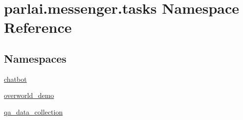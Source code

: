 \hypertarget{namespaceparlai_1_1messenger_1_1tasks}{}\section{parlai.\+messenger.\+tasks Namespace Reference}
\label{namespaceparlai_1_1messenger_1_1tasks}
\subsection*{Namespaces}
\begin{DoxyCompactItemize}
\item 
 \hyperlink{namespaceparlai_1_1messenger_1_1tasks_1_1chatbot}{chatbot}
\item 
 \hyperlink{namespaceparlai_1_1messenger_1_1tasks_1_1overworld__demo}{overworld\+\_\+demo}
\item 
 \hyperlink{namespaceparlai_1_1messenger_1_1tasks_1_1qa__data__collection}{qa\+\_\+data\+\_\+collection}
\end{DoxyCompactItemize}
